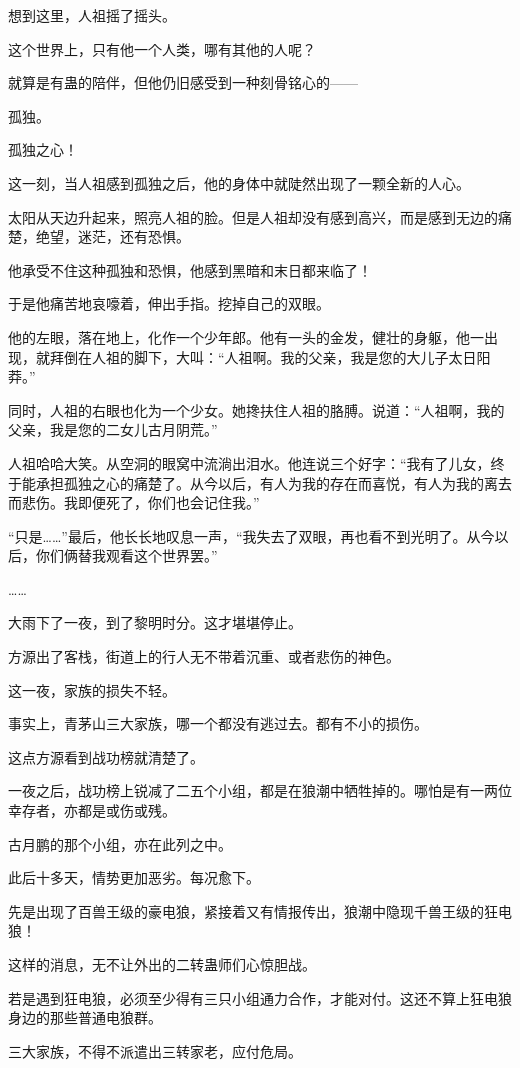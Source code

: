 \begin{this_body}
想到这里，人祖摇了摇头。

这个世界上，只有他一个人类，哪有其他的人呢？

就算是有蛊的陪伴，但他仍旧感受到一种刻骨铭心的——

孤独。

孤独之心！

这一刻，当人祖感到孤独之后，他的身体中就陡然出现了一颗全新的人心。

太阳从天边升起来，照亮人祖的脸。但是人祖却没有感到高兴，而是感到无边的痛楚，绝望，迷茫，还有恐惧。

他承受不住这种孤独和恐惧，他感到黑暗和末日都来临了！

于是他痛苦地哀嚎着，伸出手指。挖掉自己的双眼。

他的左眼，落在地上，化作一个少年郎。他有一头的金发，健壮的身躯，他一出现，就拜倒在人祖的脚下，大叫：“人祖啊。我的父亲，我是您的大儿子太日阳莽。”

同时，人祖的右眼也化为一个少女。她搀扶住人祖的胳膊。说道：“人祖啊，我的父亲，我是您的二女儿古月阴荒。”

人祖哈哈大笑。从空洞的眼窝中流淌出泪水。他连说三个好字：“我有了儿女，终于能承担孤独之心的痛楚了。从今以后，有人为我的存在而喜悦，有人为我的离去而悲伤。我即便死了，你们也会记住我。”

“只是……”最后，他长长地叹息一声，“我失去了双眼，再也看不到光明了。从今以后，你们俩替我观看这个世界罢。”

……

大雨下了一夜，到了黎明时分。这才堪堪停止。

方源出了客栈，街道上的行人无不带着沉重、或者悲伤的神色。

这一夜，家族的损失不轻。

事实上，青茅山三大家族，哪一个都没有逃过去。都有不小的损伤。

这点方源看到战功榜就清楚了。

一夜之后，战功榜上锐减了二五个小组，都是在狼潮中牺牲掉的。哪怕是有一两位幸存者，亦都是或伤或残。

古月鹏的那个小组，亦在此列之中。

此后十多天，情势更加恶劣。每况愈下。

先是出现了百兽王级的豪电狼，紧接着又有情报传出，狼潮中隐现千兽王级的狂电狼！

这样的消息，无不让外出的二转蛊师们心惊胆战。

若是遇到狂电狼，必须至少得有三只小组通力合作，才能对付。这还不算上狂电狼身边的那些普通电狼群。

三大家族，不得不派遣出三转家老，应付危局。


\end{this_body}

